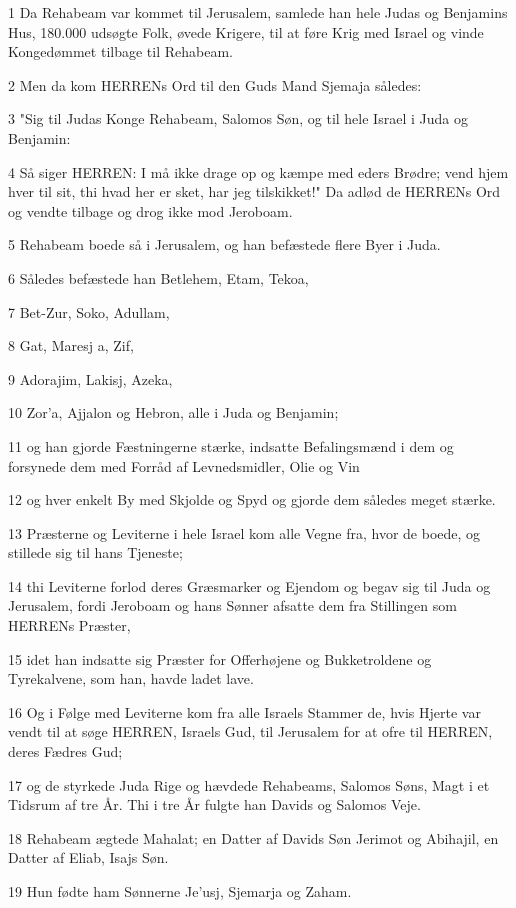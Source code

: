 \par 1 Da Rehabeam var kommet til Jerusalem, samlede han hele Judas og Benjamins Hus, 180.000 udsøgte Folk, øvede Krigere, til at føre Krig med Israel og vinde Kongedømmet tilbage til Rehabeam.
\par 2 Men da kom HERRENs Ord til den Guds Mand Sjemaja således:
\par 3 "Sig til Judas Konge Rehabeam, Salomos Søn, og til hele Israel i Juda og Benjamin:
\par 4 Så siger HERREN: I må ikke drage op og kæmpe med eders Brødre; vend hjem hver til sit, thi hvad her er sket, har jeg tilskikket!" Da adlød de HERRENs Ord og vendte tilbage og drog ikke mod Jeroboam.
\par 5 Rehabeam boede så i Jerusalem, og han befæstede flere Byer i Juda.
\par 6 Således befæstede han Betlehem, Etam, Tekoa,
\par 7 Bet-Zur, Soko, Adullam,
\par 8 Gat, Maresj a, Zif,
\par 9 Adorajim, Lakisj, Azeka,
\par 10 Zor'a, Ajjalon og Hebron, alle i Juda og Benjamin;
\par 11 og han gjorde Fæstningerne stærke, indsatte Befalingsmænd i dem og forsynede dem med Forråd af Levnedsmidler, Olie og Vin
\par 12 og hver enkelt By med Skjolde og Spyd og gjorde dem således meget stærke.
\par 13 Præsterne og Leviterne i hele Israel kom alle Vegne fra, hvor de boede, og stillede sig til hans Tjeneste;
\par 14 thi Leviterne forlod deres Græsmarker og Ejendom og begav sig til Juda og Jerusalem, fordi Jeroboam og hans Sønner afsatte dem fra Stillingen som HERRENs Præster,
\par 15 idet han indsatte sig Præster for Offerhøjene og Bukketroldene og Tyrekalvene, som han, havde ladet lave.
\par 16 Og i Følge med Leviterne kom fra alle Israels Stammer de, hvis Hjerte var vendt til at søge HERREN, Israels Gud, til Jerusalem for at ofre til HERREN, deres Fædres Gud;
\par 17 og de styrkede Juda Rige og hævdede Rehabeams, Salomos Søns, Magt i et Tidsrum af tre År. Thi i tre År fulgte han Davids og Salomos Veje.
\par 18 Rehabeam ægtede Mahalat; en Datter af Davids Søn Jerimot og Abihajil, en Datter af Eliab, Isajs Søn.
\par 19 Hun fødte ham Sønnerne Je'usj, Sjemarja og Zaham.
